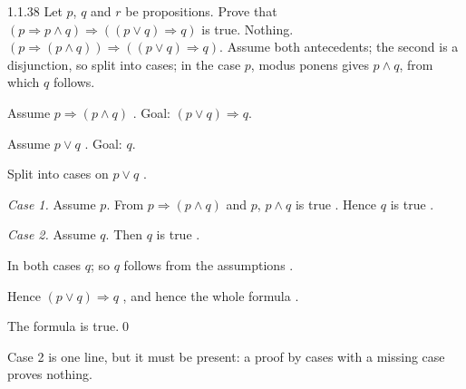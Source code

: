 \begin{bookex}[essential]{1.1.38}
Let $p$, $q$ and $r$ be propositions. Prove that $(p\Rightarrow p\wedge q)\Rightarrow((p\vee q)\Rightarrow q)$ is true.
\solution
\given Nothing.
\goal $(p\Rightarrow(p\wedge q))\Rightarrow((p\vee q)\Rightarrow q)$.
\plan Assume both antecedents; the second is a disjunction, so split into cases; in the case $p$, modus ponens gives $p\wedge q$, from which $q$ follows.
\begin{steps}
\item Assume $p\Rightarrow(p\wedge q)$ . Goal: $(p\vee q)\Rightarrow q$.
\item Assume $p\vee q$ . Goal: $q$.
\item Split into cases on $p\vee q$ .
\item \emph{Case 1.} Assume $p$. From $p\Rightarrow(p\wedge q)$ and $p$, $p\wedge q$ is true . Hence $q$ is true .
\item \emph{Case 2.} Assume $q$. Then $q$ is true .
\item In both cases $q$; so $q$ follows from the assumptions .
\item Hence $(p\vee q)\Rightarrow q$ , and hence the whole formula .
\end{steps}
\conclusion The formula is true.\qed
\begin{compare}
\item Case 2 is one line, but it must be present: a proof by cases with a missing case proves nothing.
\end{compare}
\end{bookex}

